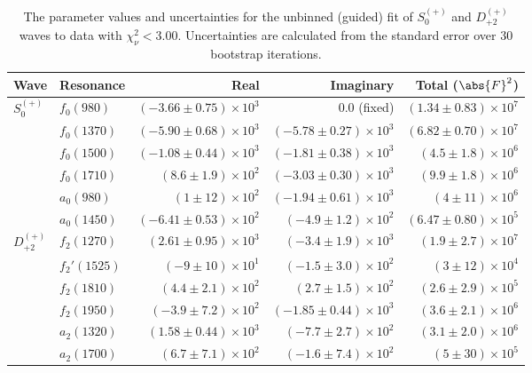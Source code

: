\begin{table}[h]
    \begin{center}
        \begin{tabular}{llrrr}\toprule
        Wave & Resonance & Real & Imaginary & Total ($\abs{F}^2$) \\\midrule
$S_{0}^{(+)}$ & $f_{0}(980)$ & $(-3.66 \pm 0.75) \times 10^{3}$ & $0.0$ (fixed) & $(1.34 \pm 0.83) \times 10^{7}$ \\
 & $f_{0}(1370)$ & $(-5.90 \pm 0.68) \times 10^{3}$ & $(-5.78 \pm 0.27) \times 10^{3}$ & $(6.82 \pm 0.70) \times 10^{7}$ \\
 & $f_{0}(1500)$ & $(-1.08 \pm 0.44) \times 10^{3}$ & $(-1.81 \pm 0.38) \times 10^{3}$ & $(4.5 \pm 1.8) \times 10^{6}$ \\
 & $f_{0}(1710)$ & $(8.6 \pm 1.9) \times 10^{2}$ & $(-3.03 \pm 0.30) \times 10^{3}$ & $(9.9 \pm 1.8) \times 10^{6}$ \\
 & $a_{0}(980)$ & $(1 \pm 12) \times 10^{2}$ & $(-1.94 \pm 0.61) \times 10^{3}$ & $(4 \pm 11) \times 10^{6}$ \\
 & $a_{0}(1450)$ & $(-6.41 \pm 0.53) \times 10^{2}$ & $(-4.9 \pm 1.2) \times 10^{2}$ & $(6.47 \pm 0.80) \times 10^{5}$ \\
$D_{+2}^{(+)}$ & $f_{2}(1270)$ & $(2.61 \pm 0.95) \times 10^{3}$ & $(-3.4 \pm 1.9) \times 10^{3}$ & $(1.9 \pm 2.7) \times 10^{7}$ \\
 & $f_{2}'(1525)$ & $(-9 \pm 10) \times 10^{1}$ & $(-1.5 \pm 3.0) \times 10^{2}$ & $(3 \pm 12) \times 10^{4}$ \\
 & $f_{2}(1810)$ & $(4.4 \pm 2.1) \times 10^{2}$ & $(2.7 \pm 1.5) \times 10^{2}$ & $(2.6 \pm 2.9) \times 10^{5}$ \\
 & $f_{2}(1950)$ & $(-3.9 \pm 7.2) \times 10^{2}$ & $(-1.85 \pm 0.44) \times 10^{3}$ & $(3.6 \pm 2.1) \times 10^{6}$ \\
 & $a_{2}(1320)$ & $(1.58 \pm 0.44) \times 10^{3}$ & $(-7.7 \pm 2.7) \times 10^{2}$ & $(3.1 \pm 2.0) \times 10^{6}$ \\
 & $a_{2}(1700)$ & $(6.7 \pm 7.1) \times 10^{2}$ & $(-1.6 \pm 7.4) \times 10^{2}$ & $(5 \pm 30) \times 10^{5}$ \\\bottomrule
        \end{tabular}
    \caption{The parameter values and uncertainties for the unbinned (guided) fit of $S_{0}^{(+)}$ and $D_{+2}^{(+)}$ waves to data with $\chi^2_\nu < 3.00$. Uncertainties are calculated from the standard error over $30$ bootstrap iterations.}\label{tab:unbinned-fit-chisqdof-3.0-guided-Sp0p-Dp2p}
    \end{center}
\end{table}
